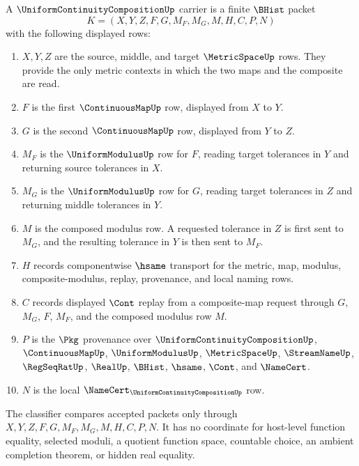 \begin{definition}
\label{def:uniform-continuity-composition-carrier}
A $\UniformContinuityCompositionUp$ carrier is a finite $\BHist$ packet
$$
K=(X,Y,Z,F,G,M_F,M_G,M,H,C,P,N)
$$
with the following displayed rows:
\begin{enumerate}
\item $X,Y,Z$ are the source, middle, and target $\MetricSpaceUp$ rows. They provide the only metric contexts in which the two maps and the composite are read.
\item $F$ is the first $\ContinuousMapUp$ row, displayed from $X$ to $Y$.
\item $G$ is the second $\ContinuousMapUp$ row, displayed from $Y$ to $Z$.
\item $M_F$ is the $\UniformModulusUp$ row for $F$, reading target tolerances in $Y$ and returning source tolerances in $X$.
\item $M_G$ is the $\UniformModulusUp$ row for $G$, reading target tolerances in $Z$ and returning middle tolerances in $Y$.
\item $M$ is the composed modulus row. A requested tolerance in $Z$ is first sent to $M_G$, and the resulting tolerance in $Y$ is then sent to $M_F$.
\item $H$ records componentwise $\hsame$ transport for the metric, map, modulus, composite-modulus, replay, provenance, and local naming rows.
\item $C$ records displayed $\Cont$ replay from a composite-map request through $G$, $M_G$, $F$, $M_F$, and the composed modulus row $M$.
\item $P$ is the $\Pkg$ provenance over $\UniformContinuityCompositionUp$, $\ContinuousMapUp$, $\UniformModulusUp$, $\MetricSpaceUp$, $\StreamNameUp$, $\RegSeqRatUp$, $\RealUp$, $\BHist$, $\hsame$, $\Cont$, and $\NameCert$.
\item $N$ is the local $\NameCert_{\UniformContinuityCompositionUp}$ row.
\end{enumerate}
The classifier compares accepted packets only through $X,Y,Z,F,G,M_F,M_G,M,H,C,P,N$. It has no coordinate for host-level function equality, selected moduli, a quotient function space, countable choice, an ambient completion theorem, or hidden real equality.
\end{definition}

